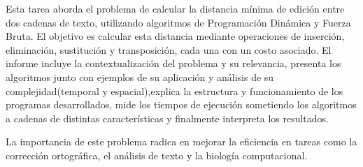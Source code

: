 Esta tarea aborda el problema de calcular la distancia mínima de edición entre dos cadenas de texto, utilizando algoritmos de Programación Dinámica y Fuerza Bruta. El objetivo es calcular esta distancia mediante operaciones de inserción, eliminación, sustitución y transposición, cada una con un costo asociado.
El informe incluye la contextualización del problema y su relevancia, presenta los algoritmos junto con ejemplos de su aplicación y análisis de su complejidad(temporal y espacial),explica la estructura y funcionamiento de los programas desarrollados, mide los tiempos de ejecución sometiendo los algoritmos a cadenas de distintas características y finalmente interpreta los resultados.

La importancia de este problema radica en mejorar la eficiencia en tareas como la corrección ortográfica, el análisis de texto y la biología computacional.



